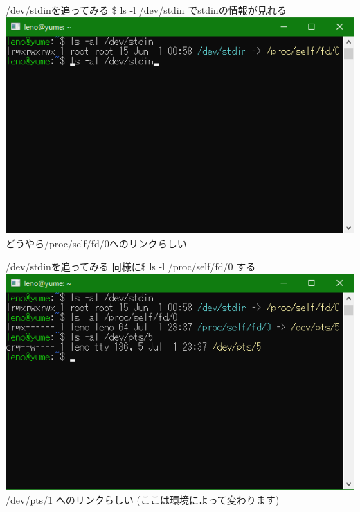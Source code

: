 \documentclass[uplatex, dvipdfmx, unicode]{beamer}
\begin{document}
\begin{frame}{/dev/stdinを追ってみる}
  \$ ls -l /dev/stdin でstdinの情報が見れる \\
  \vspace{0.2in}
  {
    \centering
    \includegraphics[keepaspectratio, scale=.5]{./img/stdin.png} \\
  }
  どうやら/proc/self/fd/0へのリンクらしい \\
\end{frame}

\begin{frame}{/dev/stdinを追ってみる}
  同様に\$ ls -l /proc/self/fd/0 する \\
  \vspace{0.2in}
  {
    \centering
    \includegraphics[keepaspectratio, scale=.5]{./img/self.png} \\
  }
  /dev/pts/1 へのリンクらしい (ここは環境によって変わります)
\end{frame}
\end{document}
